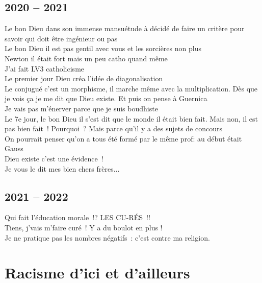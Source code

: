 \documentclass[french, a4paper, openany]{book}
\begin{document}
	\subsection*{2020 -- 2021}
		\noindent \og Le bon Dieu dans son immense mansuétude à décidé de faire un critère pour savoir qui doit être ingénieur ou pas \fg \\
		\og Le bon Dieu il est pas gentil avec vous et les sorcières non plus \fg \\
		\og Newton il était fort mais un peu catho quand même \fg \\
		\og J'ai fait LV3 catholicisme \fg \\
		\og Le premier jour Dieu créa l'idée de diagonalisation \fg \\
		\og Le conjugué c'est un morphisme, il marche même avec la multiplication. Dès que je vois ça je me dit que Dieu existe. Et puis on pense à Guernica \fg \\
		\og Je vais pas m'énerver parce que je suis boudhiste \fg \\
		\og Le 7e jour, le bon Dieu il s'est dit que le monde il était bien fait. Mais non, il est pas bien fait~! Pourquoi~? Mais parce qu'il y a des sujets de concours \fg \\
		\og On pourrait penser qu'on a tous été formé par le même prof: au début était Gauss \fg \\
		\og Dieu existe c'est une évidence~! \fg \\
		\og Je vous le dit mes bien chers frères... \fg \\

	\subsection*{2021 -- 2022}
		\noindent \og Qui fait l'éducation morale~!? LES CU-RÉS~!! \fg \\
		\og Tiens, j'vais m'faire curé~! Y a du boulot en plus ! \fg \\
		\og Je ne pratique pas les nombres négatifs~: c'est contre ma religion. \fg \\

\section*{Racisme d'ici et d'ailleurs}
\end{document}
